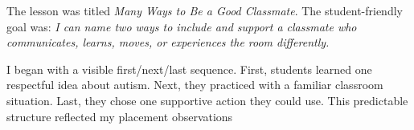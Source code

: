 
The lesson was titled \textit{Many Ways to Be a Good Classmate}. The student-friendly goal was: \textit{I can name two ways to include and support a classmate who communicates, learns, moves, or experiences the room differently.}

I began with a visible first/next/last sequence. First, students learned one respectful idea about autism. Next, they practiced with a familiar classroom situation. Last, they chose one supportive action they could use. This predictable structure reflected my placement observations